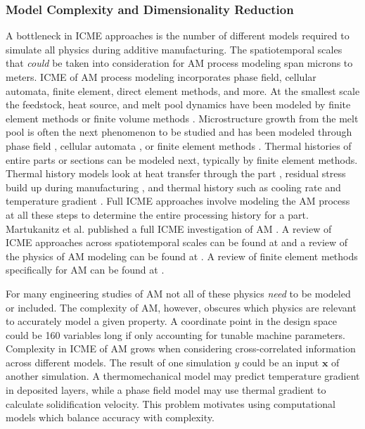 \subsubsection{Model Complexity and Dimensionality Reduction}
A bottleneck in ICME approaches is the number of different models required to simulate all physics during additive manufacturing. The spatiotemporal scales that \textit{could} be taken into consideration for AM process modeling span microns to meters. ICME of AM process modeling incorporates phase field, cellular automata, finite element, direct element methods, and more. At the smallest scale the feedstock, heat source, and melt pool dynamics have been modeled by finite element methods \cite{Toyserkani2004, Khairallah2016, Manvatkar2014} or finite  volume methods \cite{Dai2014}. Microstructure growth from the melt pool is often the next phenomenon to be studied and has been modeled through phase field \cite{Chen2002, Gong2015, Kundin2015, Sahoo2016}, cellular automata \cite{Tan2011}, or finite element methods \cite{Nie2014}. Thermal histories of entire parts or sections can be modeled next, typically by finite element methods. Thermal history models look at heat transfer through the part \cite{Michaleris2014}, residual stress build up during manufacturing \cite{Pal2014, Ding2011}, and thermal history such as cooling rate and temperature gradient \cite{Li2014, Raghavan2016}. Full ICME approaches involve modeling the AM process at all these steps to determine the entire processing history for a part. Martukanitz et al. published a full ICME investigation of AM \cite{Martukanitz2014}. A review of ICME approaches across spatiotemporal scales can be found at \cite{Francois2017} and a review of the physics of AM modeling can be found at \cite{King2015a}. A review of finite element methods specifically for AM can be found at \cite{Gouge2018}. 

For many engineering studies of AM not all of these physics \textit{need} to be modeled or included. The complexity of AM, however, obscures which physics are relevant to accurately model a given property. A coordinate point in the design space could be 160 variables long if only accounting for tunable machine parameters. Complexity in ICME of AM grows when considering cross-correlated information across different models. The result of one simulation $y$ could be an input $\mathbf{x}$ of another simulation. A thermomechanical model may predict temperature gradient in deposited layers, while a phase field model may use thermal gradient to calculate solidification velocity. This problem motivates using computational models which balance accuracy with complexity.

